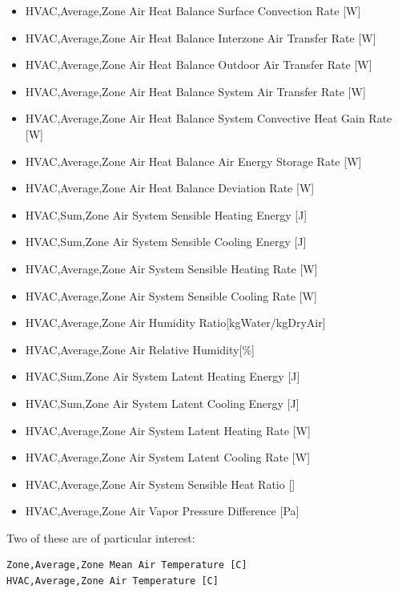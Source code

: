 \begin{itemize}
  HVAC,Average,Zone Air Heat Balance Internal Convective Heat Gain Rate {[}W{]}
\item
  HVAC,Average,Zone Air Heat Balance Surface Convection Rate {[}W{]}
\item
  HVAC,Average,Zone Air Heat Balance Interzone Air Transfer Rate {[}W{]}
\item
  HVAC,Average,Zone Air Heat Balance Outdoor Air Transfer Rate {[}W{]}
\item
  HVAC,Average,Zone Air Heat Balance System Air Transfer Rate {[}W{]}
\item
  HVAC,Average,Zone Air Heat Balance System Convective Heat Gain Rate {[}W{]}
\item
  HVAC,Average,Zone Air Heat Balance Air Energy Storage Rate {[}W{]}
\item
  HVAC,Average,Zone Air Heat Balance Deviation Rate {[}W{]}
\item
  HVAC,Sum,Zone Air System Sensible Heating Energy {[}J{]}
\item
  HVAC,Sum,Zone Air System Sensible Cooling Energy {[}J{]}
\item
  HVAC,Average,Zone Air System Sensible Heating Rate {[}W{]}
\item
  HVAC,Average,Zone Air System Sensible Cooling Rate {[}W{]}
\item
  HVAC,Average,Zone Air Humidity Ratio{[}kgWater/kgDryAir{]}
\item
  HVAC,Average,Zone Air Relative Humidity{[}\%{]}
\item
  HVAC,Sum,Zone Air System Latent Heating Energy {[}J{]}
\item
  HVAC,Sum,Zone Air System Latent Cooling Energy {[}J{]}
\item
  HVAC,Average,Zone Air System Latent Heating Rate {[}W{]}
\item
  HVAC,Average,Zone Air System Latent Cooling Rate {[}W{]}
\item
  HVAC,Average,Zone Air System Sensible Heat Ratio {[}{]}
\item
  HVAC,Average,Zone Air Vapor Pressure Difference {[}Pa{]}

\end{itemize}

Two of these are of particular interest:

\begin{lstlisting}
Zone,Average,Zone Mean Air Temperature [C]
HVAC,Average,Zone Air Temperature [C]
\end{lstlisting}

